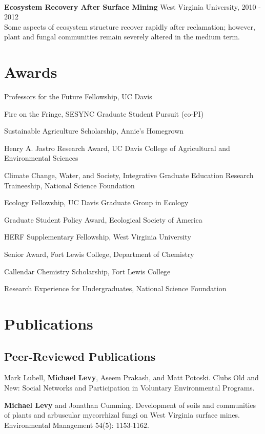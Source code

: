 ~

\textbf{Ecosystem Recovery After Surface Mining} West Virginia
University, 2010 - 2012\\
Some aspects of ecosystem structure recover rapidly after reclamation;
however, plant and fungal communities remain severely altered in the
medium term.

\section{Awards}\label{awards}

\begin{description}
\tightlist
\item[2015]
Professors for the Future Fellowship, UC Davis
\item[2014]
Fire on the Fringe, SESYNC Graduate Student Pursuit (co-PI)
\item[2014]
Sustainable Agriculture Scholarship, Annie's Homegrown
\item[2014]
Henry A. Jastro Research Award, UC Davis College of Agricultural and
Environmental Sciences
\item[2012]
Climate Change, Water, and Society, Integrative Graduate Education
Research Traineeship, National Science Foundation
\item[2012]
Ecology Fellowship, UC Davis Graduate Group in Ecology
\item[2011]
Graduate Student Policy Award, Ecological Society of America
\item[2009]
HERF Supplementary Fellowship, West Virginia University
\item[2004]
Senior Award, Fort Lewis College, Department of Chemistry
\item[2003]
Callendar Chemistry Scholarship, Fort Lewis College
\item[2003]
Research Experience for Undergraduates, National Science Foundation
\end{description}

\section{Publications}\label{publications}

\subsection{Peer-Reviewed
Publications}\label{peer-reviewed-publications}

\begin{description}
\tightlist
\item[In review]
Mark Lubell, \textbf{Michael Levy}, Aseem Prakash, and Matt Potoski.
Clubs Old and New: Social Networks and Participation in Voluntary
Environmental Programs.
\item[2014]
\textbf{Michael Levy} and Jonathan Cumming. Development of soils and
communities of plants and arbuscular mycorrhizal fungi on West Virginia
surface mines. Environmental Management 54(5): 1153-1162.
\end{description}

